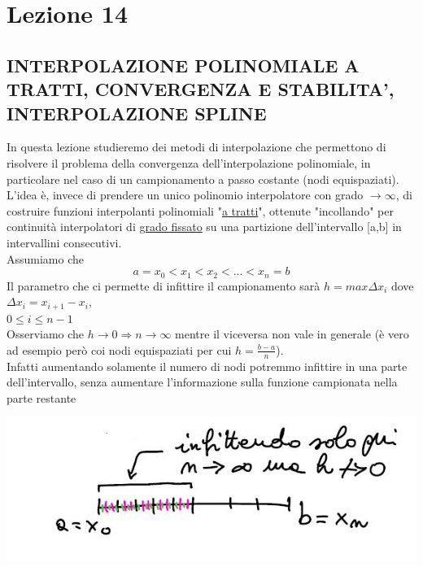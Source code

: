 \documentclass[12pt,a4paper]{article}
\begin{document}
\section*{Lezione 14}
\subsection*{INTERPOLAZIONE POLINOMIALE A TRATTI, CONVERGENZA E STABILITA', INTERPOLAZIONE SPLINE}
In questa lezione studieremo dei metodi di interpolazione che permettono di risolvere il problema della convergenza dell'interpolazione polinomiale, in particolare nel caso di un campionamento a passo costante (nodi equispaziati).\\ L'idea è, invece di prendere un unico polinomio interpolatore
con grado $\rightarrow\infty$, di costruire funzioni interpolanti polinomiali "\underline{a tratti}", ottenute "incollando" per continuità interpolatori di \underline{grado fissato} su una partizione dell'intervallo [a,b] in intervallini consecutivi.\\ Assumiamo che 
\begin{equation*}
    a=x_0<x_1<x_2<...<x_n=b
\end{equation*}
Il parametro che ci permette di infittire il campionamento sarà $h=max\Delta x_i$ dove $\Delta x_i= x_{i+1}-x_i$,\\$0\leq i\leq n-1$\\
Osserviamo che $h\rightarrow0\Rightarrow n\rightarrow\infty$ mentre il viceversa non vale in generale (è vero ad esempio però coi nodi equispaziati per cui $h=\frac{b-a}{n}$).\\ Infatti aumentando solamente il numero di nodi potremmo infittire in una parte dell'intervallo, senza aumentare l'informazione sulla funzione campionata nella parte restante
\begin{center}
    \includegraphics[scale=0.5]{calcolo.JPG}
\end{center}
\end{document}
